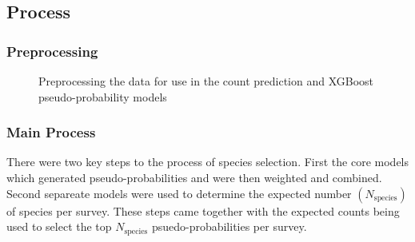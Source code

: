 \subsection{Process}

\subsubsection{Preprocessing}
\begin{figure}\label{fig:preproc}
    \begin{center}
        
        \caption{Preprocessing the data for use in the count prediction and XGBoost pseudo-probability models}
    \end{center}
\end{figure}



\subsubsection{Main Process}
\newcommand{\nspecies}{N_{\text{species}}}

There were two key steps to the process of species selection. First the core models which generated pseudo-probabilities and were then weighted and combined. 
Second separeate models were used to determine the expected number $(\nspecies)$ of species per survey. 
These steps came together with the expected counts being used to select the top  $\nspecies$ psuedo-probabilities per survey.

%         
%         

